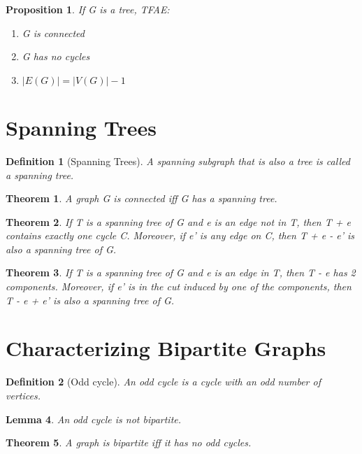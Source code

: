 \documentclass[11pt, oneside]{book}
\theoremstyle{break}
\newtheorem{thm}{Theorem}[section]
\newtheorem{lemma}[thm]{Lemma}
\newtheorem{propo}{Proposition}[section]
\newtheorem{defn}{Definition}[section]
\begin{document}
\begin{propo}
	If G is a tree, TFAE:
	\begin{enumerate}
		\item G is connected
		\item G has no cycles
		\item $|E(G)| = |V(G)| - 1$
	\end{enumerate}
\end{propo}


\section{Spanning Trees}

\begin{defn}[Spanning Trees]
	A spanning subgraph that is also a tree is called a spanning tree.
\end{defn}

\begin{thm}
	A graph G is connected iff G has a spanning tree.
\end{thm}

\begin{thm}
	If T is a spanning tree of G and e is an edge not in T, then T + e contains exactly one cycle C. Moreover, if e' is any edge on C, then T + e - e' is also a spanning tree of G.
\end{thm}

\begin{thm}
	If T is a spanning tree of G and e is an edge in T, then T - e has 2 components. Moreover, if e' is in the cut induced by one of the components, then T - e + e' is also a spanning tree of G.
\end{thm}


\section{Characterizing Bipartite Graphs}

\begin{defn}[Odd cycle]
	An odd cycle is a cycle with an odd number of vertices.
\end{defn}

\begin{lemma}
	An odd cycle is not bipartite.
\end{lemma}

\begin{thm}
	A graph is bipartite iff it has no odd cycles.
\end{thm}
\end{document}
